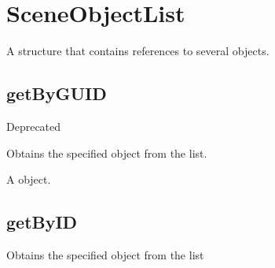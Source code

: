 \documentclass[letterpaper,12pt,english,openany,oneside]{sphinxmanual}
\begin{document}
\label{\detokenize{JS_3D_API:properties-26}}


\section{SceneObjectList}
\label{\detokenize{JS_3D_API:sceneobjectlist}}
A structure that contains references to several  objects.

\label{\detokenize{JS_3D_API:properties-27}}


\subsection{getByGUID}
\label{\detokenize{JS_3D_API:getbyguid}}
Deprecated

Obtains the specified  object from the list.

\label{\detokenize{JS_3D_API:syntax-108}}

\begin{sphinxVerbatim}[commandchars=\\\{\}]
\end{sphinxVerbatim}
\label{\detokenize{JS_3D_API:parameters-78}}

\label{\detokenize{JS_3D_API:section-109}}\label{\detokenize{JS_3D_API:returns-109}}

A  object.


\subsection{getByID}
\label{\detokenize{JS_3D_API:getbyid}}
Obtains the specified  object from the list

\label{\detokenize{JS_3D_API:syntax-109}}

\begin{sphinxVerbatim}[commandchars=\\\{\}]
\end{sphinxVerbatim}
\label{\detokenize{JS_3D_API:parameters-79}}
\end{document}

